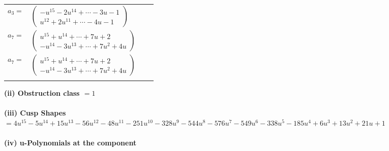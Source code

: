 \documentclass[1p]{elsarticle_modified}
\theoremstyle{definition}
\begin{document}
\begin{tabular}{m{7pt} m{180pt} m{7pt} m{180pt} }
\flushright $a_{3}=$&$\begin{pmatrix}- u^{15}-2 u^{14}+\cdots-3 u-1\\u^{12}+2 u^{11}+\cdots-4 u-1\end{pmatrix}$ \\
\flushright $a_{7}=$&$\begin{pmatrix}u^{15}+u^{14}+\cdots+7 u+2\\- u^{14}-3 u^{13}+\cdots+7 u^2+4 u\end{pmatrix}$\\ \flushright $a_{7}=$&$\begin{pmatrix}u^{15}+u^{14}+\cdots+7 u+2\\- u^{14}-3 u^{13}+\cdots+7 u^2+4 u\end{pmatrix}$\\&\end{tabular}
\flushleft \textbf{(ii) Obstruction class $= 1$}\\~\\
\flushleft \textbf{(iii) Cusp Shapes $= 4 u^{15}-5 u^{14}+15 u^{13}-56 u^{12}-48 u^{11}-251 u^{10}-328 u^9-544 u^8-576 u^7-549 u^6-338 u^5-185 u^4+6 u^3+13 u^2+21 u+1$}\\~\\
\newpage\renewcommand{\arraystretch}{1}
\flushleft \textbf{(iv) u-Polynomials at the component}\newline \\
\end{document}
